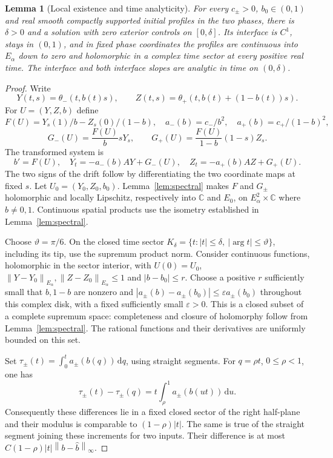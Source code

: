 \documentclass[11pt]{article}
\newtheorem{lemma}[theorem]{Lemma}
\newcommand{\dd}{\,\mathrm d}
\newcommand{\norm}[1]{\left\lVert#1\right\rVert}
\begin{document}
\begin{lemma}[Local existence and time analyticity]\label{lem:local}
For every $c_\pm>0$, $b_0\in(0,1)$ and real smooth compactly supported
initial profiles in the two phases, there is $\delta>0$ and a solution
with zero exterior controls on $[0,\delta]$. Its interface is $C^1$,
stays in $(0,1)$, and in fixed phase coordinates the profiles are
continuous into $E_\alpha$ down to zero and holomorphic in a complex
time sector at every positive real time. The interface and both interface
slopes are analytic in time on $(0,\delta)$.
\end{lemma}
\begin{proof}
Write
\[
 Y(t,s)=\theta_-(t,b(t)s),\qquad
 Z(t,s)=\theta_+(t,b(t)+(1-b(t))s).
\]
For $U=(Y,Z,b)$ define
\[
 F(U)=Y_s(1)/b-Z_s(0)/(1-b),\quad
 a_-(b)=c_-/b^2,\quad a_+(b)=c_+/(1-b)^2,
\]
\[
 G_-(U)=\frac{F(U)}b sY_s,\qquad
 G_+(U)=\frac{F(U)}{1-b}(1-s)Z_s.
\]
The transformed system is
\[
 b'=F(U),\quad Y_t=-a_-(b)AY+G_-(U),\quad
 Z_t=-a_+(b)AZ+G_+(U). \tag{3}
\]
The two signs of the drift follow by differentiating the two coordinate
maps at fixed $s$. Let $U_0=(Y_0,Z_0,b_0)$.
Lemma~\ref{lem:spectral} makes $F$ and $G_\pm$ holomorphic and locally Lipschitz, respectively
into $\mathbb C$ and $E_0$, on $E_\alpha^2\times\mathbb C$ where
$b\ne0,1$. Continuous spatial products use the isometry established in Lemma~\ref{lem:spectral}.

Choose $\vartheta=\pi/6$. On the closed time sector
$K_\delta=\{t:|t|\le\delta,\ |\arg t|\le\vartheta\}$, including its
tip, use the supremum product norm. Consider continuous functions,
holomorphic in the sector interior, with $U(0)=U_0$,
$\norm{Y-Y_0}_{E_\alpha},\norm{Z-Z_0}_{E_\alpha}\le1$ and
$|b-b_0|\le r$. Choose a positive $r$ sufficiently small that
$b,1-b$ are nonzero and
$|a_\pm(b)-a_\pm(b_0)|\le\varepsilon a_\pm(b_0)$ throughout this
complex disk, with a fixed sufficiently small $\varepsilon>0$.
This is a closed subset of a complete supremum space: completeness
and closure of holomorphy follow from Lemma~\ref{lem:spectral}. The rational functions and
their derivatives are uniformly bounded on this set.

Set $\tau_\pm(t)=\int_0^t a_\pm(b(q))\dd q$, using straight segments.
For $q=\rho t$, $0\le\rho<1$, one has
\[
 \tau_\pm(t)-\tau_\pm(q)
 =t\int_\rho^1a_\pm(b(ut))\dd u.
\]
Consequently these differences lie in a fixed closed sector of the
right half-plane and their modulus is comparable to $(1-\rho)|t|$.
The same is true of the straight segment joining these increments
for two inputs. Their difference is at most
$C(1-\rho)|t|\norm{b-\widehat b}_\infty$.


\end{proof}
\end{document}
